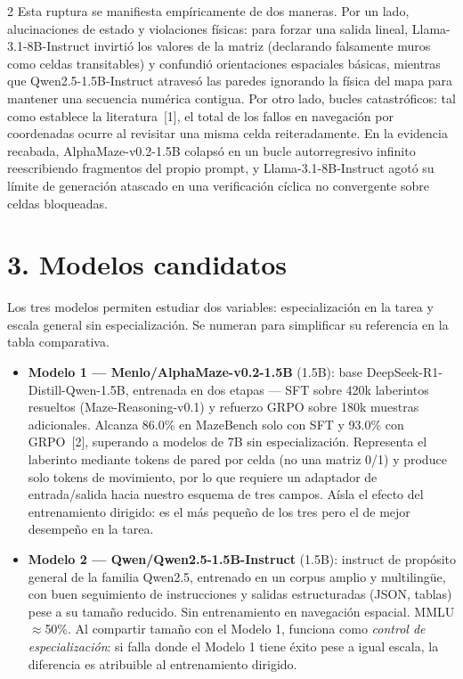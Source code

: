 \documentclass[9pt]{extarticle}
\begin{document}
\begin{multicols}{2}
Esta ruptura se manifiesta empíricamente de dos maneras. Por un lado, alucinaciones de estado y violaciones físicas: para forzar una salida lineal, Llama-3.1-8B-Instruct invirtió los valores de la matriz (declarando falsamente muros como celdas transitables) y confundió orientaciones espaciales básicas, mientras que Qwen2.5-1.5B-Instruct atravesó las paredes ignorando la física del mapa para mantener una secuencia numérica contigua. Por otro lado, bucles catastróficos: tal como establece la literatura~[1], el total de los fallos en navegación por coordenadas ocurre al revisitar una misma celda reiteradamente. En la evidencia recabada, AlphaMaze-v0.2-1.5B colapsó en un bucle autorregresivo infinito reescribiendo fragmentos del propio prompt, y Llama-3.1-8B-Instruct agotó su límite de generación atascado en una verificación cíclica no convergente sobre celdas bloqueadas.


\section*{3. Modelos candidatos}
Los tres modelos permiten estudiar dos variables: especialización en la tarea y escala general sin especialización. Se numeran para simplificar su referencia en la tabla comparativa.

\begin{itemize}
\item \textbf{Modelo 1 --- Menlo/AlphaMaze-v0.2-1.5B} (1.5B): base DeepSeek-R1-Distill-Qwen-1.5B, entrenada en dos etapas --- SFT sobre 420k laberintos resueltos (Maze-Reasoning-v0.1) y refuerzo GRPO sobre 180k muestras adicionales. Alcanza 86.0\% en MazeBench solo con SFT y 93.0\% con GRPO~[2], superando a modelos de 7B sin especialización. Representa el laberinto mediante tokens de pared por celda (no una matriz 0/1) y produce solo tokens de movimiento, por lo que requiere un adaptador de entrada/salida hacia nuestro esquema de tres campos. Aísla el efecto del entrenamiento dirigido: es el más pequeño de los tres pero el de mejor desempeño en la tarea.
\item \textbf{Modelo 2 --- Qwen/Qwen2.5-1.5B-Instruct} (1.5B): instruct de propósito general de la familia Qwen2.5, entrenado en un corpus amplio y multilingüe, con buen seguimiento de instrucciones y salidas estructuradas (JSON, tablas) pese a su tamaño reducido. Sin entrenamiento en navegación espacial. MMLU $\approx$50\%. Al compartir tamaño con el Modelo 1, funciona como \emph{control de especialización}: si falla donde el Modelo 1 tiene éxito pese a igual escala, la diferencia es atribuible al entrenamiento dirigido.


\end{itemize}
\end{multicols}
\end{document}
